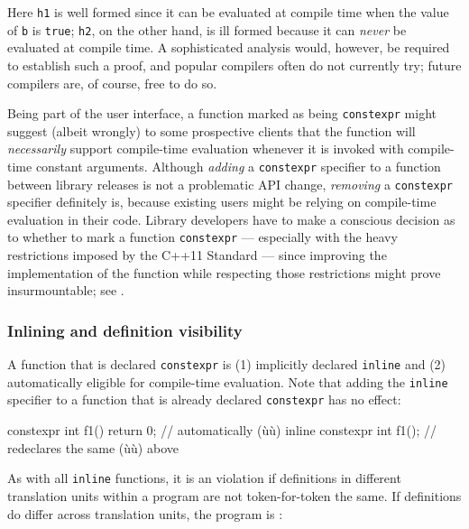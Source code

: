 \noindent Here \lstinline!h1! is well formed since it can be evaluated at compile
time when the value of \lstinline!b! is \lstinline!true!; \lstinline!h2!, on the
other hand, is ill formed because it can \emph{never} be evaluated at
compile time. A sophisticated analysis would, however, be required to
establish such a proof, and popular compilers often do not currently
try; future compilers are, of course, free to do so.

Being part of the user interface, a function marked as being
\lstinline!constexpr! might suggest (albeit wrongly) to some prospective
clients that the function will \emph{necessarily} support compile-time
evaluation whenever it is invoked with compile-time constant arguments.
Although \emph{adding} a \lstinline!constexpr! specifier to a function
between library releases is not a problematic API change,
\emph{removing} a \lstinline!constexpr! specifier definitely is, because
existing users might be relying on compile-time evaluation in their
code. Library developers have to make a conscious decision as to whether
to mark a function \lstinline!constexpr! --- especially with the heavy
restrictions imposed by the C++11 Standard --- since improving the
implementation of the function while respecting those restrictions might
prove insurmountable; see .

\subsubsection[Inlining and definition visibility]{Inlining and definition visibility}\label{inlining-and-definition-visibility}

A function that is declared \lstinline!constexpr! is (1) implicitly
declared \lstinline!inline! and (2) automatically eligible for compile-time
evaluation. Note that adding the \lstinline!inline! specifier to a function
that is already declared \lstinline!constexpr! has no effect:

\begin{emcppslisting}
       constexpr int f1() { return 0; } // automatically (ù{}ù)
inline constexpr int f1();              // redeclares the same (ù{}ù) above
\end{emcppslisting}
    

\noindent As with all \lstinline!inline! functions, it is an  violation if definitions in different translation units
within a program are not token-for-token the same. If definitions do
differ across translation units, the program is :

